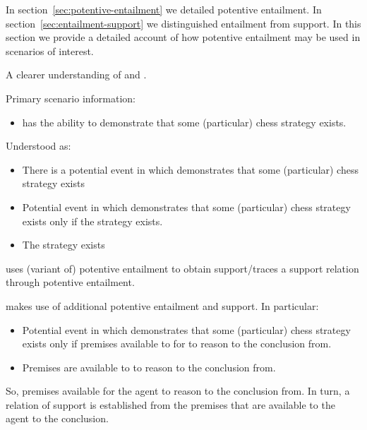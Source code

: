 \begin{note}[Overview]
  In section~\ref{sec:potentive-entailment} we detailed potentive entailment.
  In section~\ref{sec:entailment-support} we distinguished entailment from support.
  In this section we provide a detailed account of how potentive entailment may be used in scenarios of interest.

  A clearer understanding of \AR{} and \WR{}.

  Primary scenario information:
  \begin{itemize}
  \item \agent{} has the ability to demonstrate that some (particular) chess strategy exists.
  \end{itemize}
  Understood as:
  \begin{itemize}
  \item There is a potential event in which \agent{} demonstrates that some (particular) chess strategy exists
  \end{itemize}

  \begin{itemize}
  \item\label{ent:ex:chess} Potential event in which \agent{} demonstrates that some (particular) chess strategy exists only if the strategy exists.
  \item The strategy exists
  \end{itemize}

  \AR{} uses (variant of) potentive entailment to obtain support/traces a support relation through potentive entailment.

  \WR{} makes use of additional potentive entailment and support.
  In particular:

  \begin{itemize}
  \item Potential event in which \agent{} demonstrates that some (particular) chess strategy exists only if premises available to \agent{} for \agent{} to reason to the conclusion from.
  \item Premises are available to \agent{} to reason to the conclusion from.
  \end{itemize}

  So, premises available for the agent to reason to the conclusion from.
  In turn, a relation of support is established from the premises that are available to the agent to the conclusion.
\end{note}

